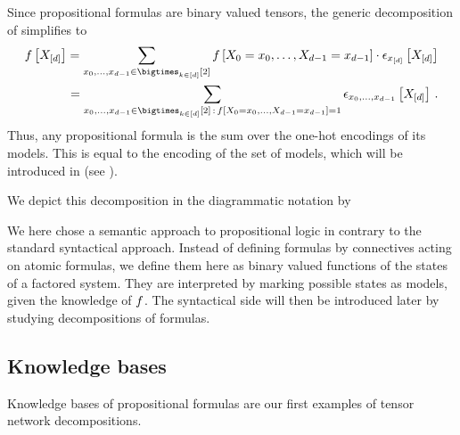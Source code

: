 Since propositional formulas are binary valued tensors, the generic decomposition of  simplifies to
\begin{align}
    \label{eq:formulaModelDecomposition}
    \formulaat{\shortcatvariables} = \sum_{\catindices\in\atomstates} \formulaat{\indexedcatvariables} \cdot \onehotmapofat{\shortcatindices}{\shortcatvariables} \\
    = \sum_{\catindices\in\atomstates \wcols \formulaat{\indexedcatvariables}=1}  \onehotmapofat{\catindices}{\shortcatvariables} \, .
\end{align}
Thus, any propositional formula is the sum over the one-hot encodings of its models.
This is equal to the encoding of the set of models, which will be introduced in  (see ).

We depict this decomposition in the diagrammatic notation by
\begin{center}
    
\end{center}

We here chose a semantic approach to propositional logic in contrary to the standard syntactical approach.
Instead of defining formulas by connectives acting on atomic formulas, we define them here as binary valued functions of the states of a factored system.
They are interpreted by marking possible states as models, given the knowledge of $f$.
The syntactical side will then be introduced later by studying decompositions of formulas.

\subsection{Knowledge bases}


Knowledge bases of propositional formulas are our first examples of tensor network decompositions.

